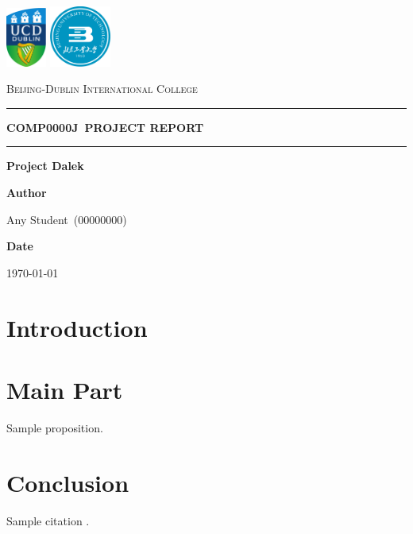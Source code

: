 \documentclass{article}
\newcommand{\name}{Any Student}
\newcommand{\idnumber}{00000000}
\newcommand{\coursecode}{COMP0000J}
\newcommand{\HRule}[1]{\rule{\linewidth}{#1}}
\begin{document}
\begin{titlepage}
    \centering
    \vspace*{1cm}
    \includegraphics[width=0.1\textwidth]{images/UCD_Logo.pdf} \hspace{0.5cm}
    \includegraphics[width=0.15\textwidth]{images/BJUT_Logo.pdf} \par
    \vspace{0.8cm}
    {\Large \textsc{Beijing-Dublin International College}} \par
    \vspace{1.5cm}
    \HRule{0.2pt} \par
    \vspace{0.5cm}
    {\Huge \textbf{\uppercase{\coursecode \ Project Report}}} \par
    \vspace{0cm}
    \HRule{0.2pt} \par
    \vspace{1.0cm}
    {\LARGE \textbf{Project Dalek}} \par
    \vspace{8cm}
    \textbf{Author} \par
    \name \ (\idnumber) \par
    \vspace{1cm}
    \textbf{Date} \par
    \today \par
    \vfill
\end{titlepage}

\tableofcontents
\newpage

\begin{abstract}
\end{abstract}

\section{Introduction}

\section{Main Part}
    \begin{proposition}
        Sample proposition.
    \end{proposition}

\section{Conclusion}
    Sample citation \cite{Smith_2012}.



\end{document}
